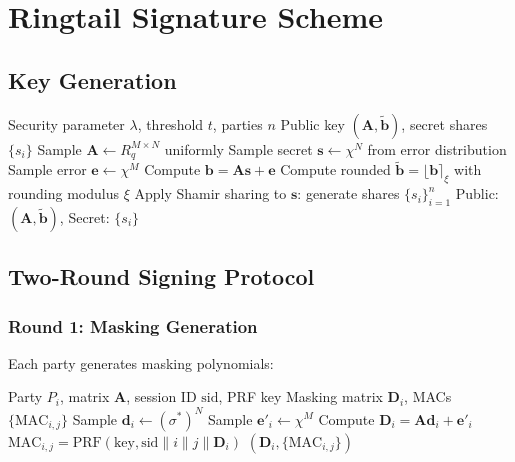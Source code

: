 \documentclass[11pt,a4paper]{article}
\theoremstyle{definition}
\begin{document}
\section{Ringtail Signature Scheme}

\subsection{Key Generation}

\begin{algorithm}
\caption{Ringtail Key Generation}
\begin{algorithmic}[1]
\Require Security parameter $\lambda$, threshold $t$, parties $n$
\Ensure Public key $(\mathbf{A}, \tilde{\mathbf{b}})$, secret shares $\{s_i\}$
\State Sample $\mathbf{A} \leftarrow R_q^{M \times N}$ uniformly
\State Sample secret $\mathbf{s} \leftarrow \chi^N$ from error distribution
\State Sample error $\mathbf{e} \leftarrow \chi^M$
\State Compute $\mathbf{b} = \mathbf{A}\mathbf{s} + \mathbf{e}$
\State Compute rounded $\tilde{\mathbf{b}} = \lfloor \mathbf{b} \rceil_\xi$ with rounding modulus $\xi$
\State Apply Shamir sharing to $\mathbf{s}$: generate shares $\{s_i\}_{i=1}^n$
\State \Return Public: $(\mathbf{A}, \tilde{\mathbf{b}})$, Secret: $\{s_i\}$
\end{algorithmic}
\end{algorithm}

\subsection{Two-Round Signing Protocol}

\subsubsection{Round 1: Masking Generation}

Each party generates masking polynomials:

\begin{algorithm}
\caption{Ringtail Sign Round 1}
\begin{algorithmic}[1]
\Require Party $P_i$, matrix $\mathbf{A}$, session ID $\text{sid}$, PRF key
\Ensure Masking matrix $\mathbf{D}_i$, MACs $\{\text{MAC}_{i,j}\}$
\State Sample $\mathbf{d}_i \leftarrow (\sigma^*)^N$ 
\State Sample $\mathbf{e}'_i \leftarrow \chi^M$ 
\State Compute $\mathbf{D}_i = \mathbf{A}\mathbf{d}_i + \mathbf{e}'_i$
    \State $\text{MAC}_{i,j} = \text{PRF}(\text{key}, \text{sid} \| i \| j \| \mathbf{D}_i)$
\EndFor
\State \Return $(\mathbf{D}_i, \{\text{MAC}_{i,j}\})$
\end{algorithmic}
\end{algorithm}
\end{document}
